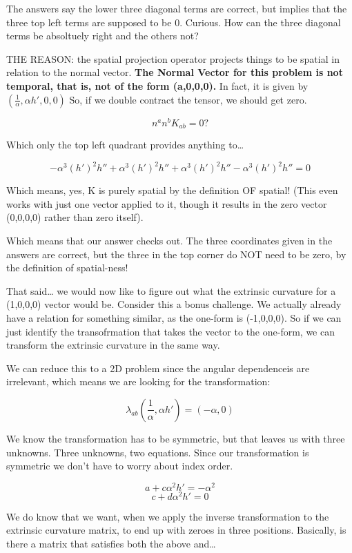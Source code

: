 \documentclass[landscape,letterpaper,10pt,english]{article}
\begin{document}
    The answers say the lower three diagonal terms are correct, but implies
that the three top left terms are supposed to be 0. Curious. How can the
three diagonal terms be absoltuely right and the others not?

THE REASON: the spatial projection operator projects things to be
spatial in relation to the normal vector. \textbf{The Normal Vector for
this problem is not temporal, that is, not of the form (a,0,0,0).} In
fact, it is given by \((\frac1\alpha , \alpha h', 0 , 0)\) So, if we
double contract the tensor, we should get zero.

\[ n^an^bK_{ab} = 0? \]

Which only the top left quadrant provides anything to\ldots{}

\[-\alpha^3 (h')^2h'' + \alpha^3 (h')^2 h'' + \alpha^3 (h')^2 h'' - \alpha^3 (h')^2 h'' = 0\]

Which means, yes, K is purely spatial by the definition OF spatial!
(This even works with just one vector applied to it, though it results
in the zero vector (0,0,0,0) rather than zero itself).

Which means that our answer checks out. The three coordinates given in
the answers are correct, but the three in the top corner do NOT need to
be zero, by the definition of spatial-ness!

That said\ldots{} we would now like to figure out what the extrinsic
curvature for a (1,0,0,0) vector would be. Consider this a bonus
challenge. We actually already have a relation for something similar, as
the one-form is (-1,0,0,0). So if we can just identify the
transofrmation that takes the vector to the one-form, we can transform
the extrinsic curvature in the same way.

We can reduce this to a 2D problem since the angular dependenceis are
irrelevant, which means we are looking for the transformation:

\[ \lambda_{ab}(\frac1\alpha, \alpha h') = (-\alpha, 0) \]

We know the transformation has to be symmetric, but that leaves us with
three unknowns. Three unknowns, two equations. Since our transformation
is symmetric we don't have to worry about index order.

    \[ a + c \alpha^2 h' = -\alpha^2 \] \[ c + d \alpha^2 h' = 0 \]

We do know that we want, when we apply the inverse transformation to the
extrinsic curvature matrix, to end up with zeroes in three positions.
Basically, is there a matrix that satisfies both the above and\ldots{}
\end{document}
